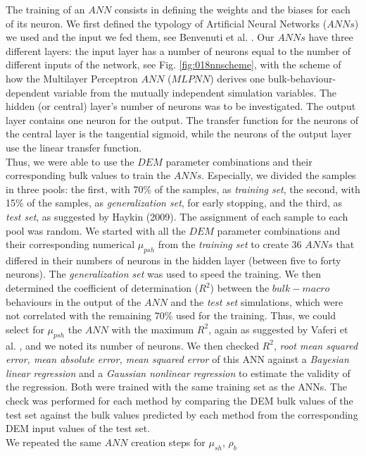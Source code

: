 The training of an $ANN$ consists in defining the weights and the biases for
each of its neuron.
We first defined the typology of Artificial Neural Networks ($ANNs$) we used and
the input we fed them, see Benvenuti et al. \cite{RefWorks:180}.
Our $ANNs$ have three different layers: the input layer has a number of neurons
equal to the number of different inputs of the network, see Fig.
\ref{fig:018nnscheme}, with the scheme of how the Multilayer Perceptron $ANN$ ($MLPNN$) derives one
bulk-behaviour-dependent variable from the mutually independent simulation variables.
The hidden (or central) layer's number of neurons was to be investigated. 
The output layer contains one neuron for the output.
The transfer function for the neurons of the central layer is the tangential
sigmoid, while the neurons of the output layer use the linear transfer
function.\\
Thus, we were able to use the $DEM$ parameter combinations and their
corresponding bulk values to train the $ANNs$.
Especially, we divided the samples in three pools: the first, with 70\% of the
samples, as \textit{training set}, the second, with 15\% of the samples, as
\textit{generalization set}, for early stopping, and the third, as \textit{test
set}, as suggested by Haykin (2009). The assignment of each sample to each pool
was random.
We started with all the $DEM$ parameter combinations and their corresponding
numerical $\mu_{psh}$ from the \textit{training set} to create 36 $ANNs$ that
differed in their numbers of neurons in the hidden layer (between five to forty neurons).
The \textit{generalization set} was used to speed the training. 
We then determined the coefficient of determination ($R^2$) between the
$bulk-macro$ behaviours in the output of the $ANN$ and the \textit{test
set} simulations, which were not correlated with the remaining 70\% used for the
training.
Thus, we could select for $\mu_{psh}$ the $ANN$ with the maximum $R^2$, 
again as suggested by Vaferi et al. \cite{RefWorks:150}, and we noted its number
of neurons.
We then checked $R^2$, \textit{root mean squared error, mean absolute error,
mean squared error} of this ANN against a \textit{Bayesian linear regression}
and a \textit{Gaussian nonlinear regression} to estimate the validity of the
regression.
Both were trained with the same training set as the ANNs. 
The check was performed for each method by comparing the DEM bulk values of 
the test set against the bulk values predicted by each method from the 
corresponding DEM input values of the test set. \\
We repeated the same $ANN$ creation steps for $\mu_{sh}$, $\rho_b$
